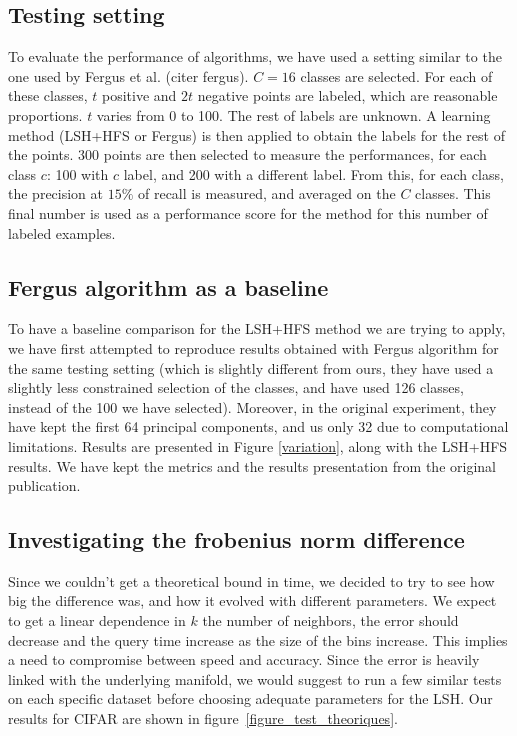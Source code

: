 \documentclass{article} %
\begin{document}
\subsection{Testing setting}
To evaluate the performance of algorithms, we have used a setting similar to the one used by Fergus et al. (citer fergus). $C=16$ classes are selected. For each of these classes, $t$ positive and $2t$ negative points are labeled, which are reasonable proportions. $t$ varies from 0 to 100. The rest of labels are unknown. A learning method (LSH+HFS or Fergus) is then applied to obtain the labels for the rest of the points. $300$ points are then selected to measure the performances, for each class $c$: 100 with $c$ label, and 200 with a different label. From this, for each class, the precision at $15\%$ of recall is measured, and averaged on the $C$ classes. This final number is used as a performance score for the method for this number of labeled examples.


\subsection{Fergus algorithm as a baseline}
To have a baseline comparison for the LSH+HFS method we are trying to apply, we have first attempted to reproduce results obtained with Fergus algorithm for the same testing setting (which is slightly different from ours, they have used a slightly less constrained selection of the classes, and have used 126 classes, instead of the 100 we have selected). Moreover, in the original experiment, they have kept the first 64 principal components, and us only 32 due to computational limitations. Results are presented in Figure \ref{variation}, along with the LSH+HFS results. We have kept the metrics and the results presentation from the original publication.

\subsection{Investigating the frobenius norm difference}
Since we couldn't get a theoretical bound in time, we decided to try to see how big the difference was, and how it evolved with different parameters. We expect to get a linear dependence in $k$ the number of neighbors, the error should decrease and the query time increase as the size of the bins increase. This implies a need to compromise between speed and accuracy. Since the error is heavily linked with the underlying manifold, we would suggest to run a few similar tests on each specific dataset before choosing adequate parameters for the LSH. Our results for CIFAR are shown in figure~\ref{figure_test_theoriques}.
\end{document}
